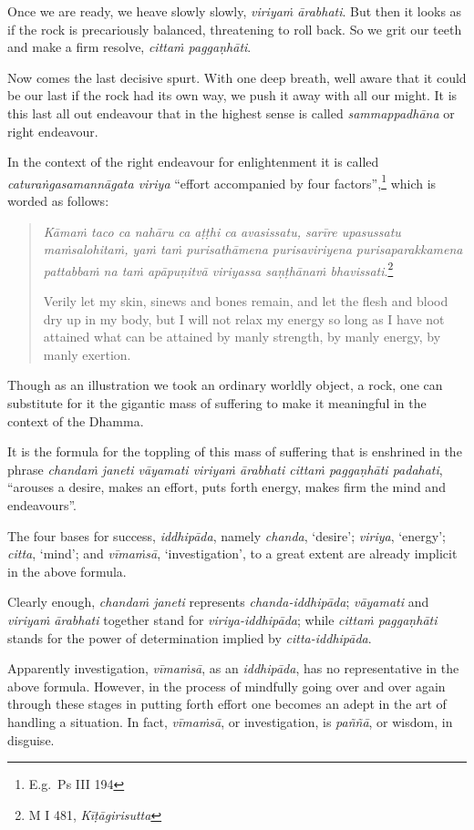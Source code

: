 Once we are ready, we heave slowly slowly, \emph{viriyaṁ ārabhati}. But then it looks as if the rock is precariously balanced, threatening to roll back. So we grit our teeth and make a firm resolve, \emph{cittaṁ paggaṇhāti}.

Now comes the last decisive spurt. With one deep breath, well aware that it could be our last if the rock had its own way, we push it away with all our might. It is this last all out endeavour that in the highest sense is called \emph{sammappadhāna} or right endeavour.

In the context of the right endeavour for enlightenment it is called \emph{caturaṅgasamannāgata viriya} ``effort accompanied by four factors'',\footnote{E.g.~Ps III 194} which is worded as follows:

\begin{quote}
\emph{Kāmaṁ taco ca nahāru ca aṭṭhi ca avasissatu, sarīre upasussatu maṁsalohitaṁ, yaṁ taṁ purisathāmena purisaviriyena purisaparakkamena pattabbaṁ na taṁ apāpuṇitvā viriyassa saṇṭhānaṁ bhavissati}.\footnote{M I 481, \emph{Kīṭāgirisutta}}

Verily let my skin, sinews and bones remain, and let the flesh and blood dry up in my body, but I will not relax my energy so long as I have not attained what can be attained by manly strength, by manly energy, by manly exertion.
\end{quote}

Though as an illustration we took an ordinary worldly object, a rock, one can substitute for it the gigantic mass of suffering to make it meaningful in the context of the Dhamma.

It is the formula for the toppling of this mass of suffering that is enshrined in the phrase \emph{chandaṁ janeti vāyamati viriyaṁ ārabhati cittaṁ paggaṇhāti padahati}, ``arouses a desire, makes an effort, puts forth energy, makes firm the mind and endeavours''.

The four bases for success, \emph{iddhipāda}, namely \emph{chanda}, `desire'; \emph{viriya}, `energy'; \emph{citta}, `mind'; and \emph{vīmaṁsā}, `investigation', to a great extent are already implicit in the above formula.

Clearly enough, \emph{chandaṁ janeti} represents \emph{chanda-iddhipāda}; \emph{vāyamati} and \emph{viriyaṁ ārabhati} together stand for \emph{viriya-iddhipāda}; while \emph{cittaṁ paggaṇhāti} stands for the power of determination implied by \emph{citta-iddhipāda}.

Apparently investigation, \emph{vīmaṁsā}, as an \emph{iddhipāda}, has no representative in the above formula. However, in the process of mindfully going over and over again through these stages in putting forth effort one becomes an adept in the art of handling a situation. In fact, \emph{vīmaṁsā}, or investigation, is \emph{paññā}, or wisdom, in disguise.

